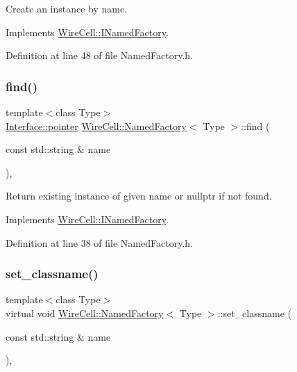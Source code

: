 Create an instance by name. 



Implements \hyperlink{class_wire_cell_1_1_i_named_factory_aab305aa4c3d65450f97f95b26475d3fe}{Wire\+Cell\+::\+I\+Named\+Factory}.



Definition at line 48 of file Named\+Factory.\+h.

\mbox{\label{class_wire_cell_1_1_named_factory_a1c0faed7ba682bd801069997d60ea81b}} 
\subsubsection{\texorpdfstring{find()}{find()}}
{\footnotesize\ttfamily template$<$class Type$>$ \\
\hyperlink{class_wire_cell_1_1_interface_a09c548fb8266cfa39afb2e74a4615c37}{Interface\+::pointer} \hyperlink{class_wire_cell_1_1_named_factory}{Wire\+Cell\+::\+Named\+Factory}$<$ Type $>$\+::find (\begin{DoxyParamCaption}\item[{const std\+::string \&}]{name }\end{DoxyParamCaption})\hspace{0.3cm}{\ttfamily [inline]}, {\ttfamily [virtual]}}



Return existing instance of given name or nullptr if not found. 



Implements \hyperlink{class_wire_cell_1_1_i_named_factory_a4e87a7c8957a57aa6d23fef2f9e1dbd3}{Wire\+Cell\+::\+I\+Named\+Factory}.



Definition at line 38 of file Named\+Factory.\+h.

\mbox{\label{class_wire_cell_1_1_named_factory_afd42539ccd3d6f8b49b0afa5b675747b}} 
\subsubsection{\texorpdfstring{set\+\_\+classname()}{set\_classname()}}
{\footnotesize\ttfamily template$<$class Type$>$ \\
virtual void \hyperlink{class_wire_cell_1_1_named_factory}{Wire\+Cell\+::\+Named\+Factory}$<$ Type $>$\+::set\+\_\+classname (\begin{DoxyParamCaption}\item[{const std\+::string \&}]{name }\end{DoxyParamCaption})\hspace{0.3cm}{\ttfamily [inline]}, {\ttfamily [virtual]}}



